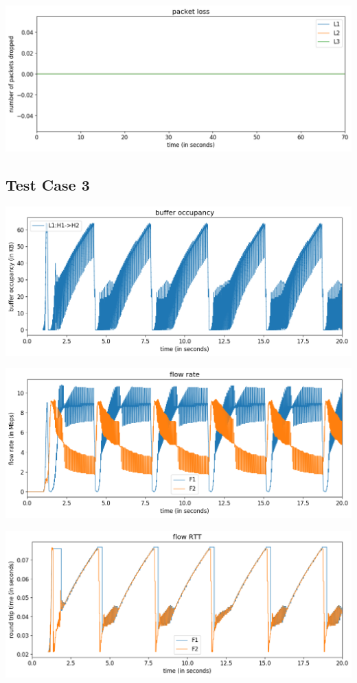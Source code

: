 \documentclass{article}
\begin{document}
\includegraphics[width = \textwidth]{"test_case2_fast packet loss"}





\subsection{Test Case 3} 

\includegraphics[width = \textwidth]{"test_case3 buffer occupancy"}

\includegraphics[width = \textwidth]{"test_case3 flow rate"}

\includegraphics[width = \textwidth]{"test_case3 flow RTT"}
\end{document}
